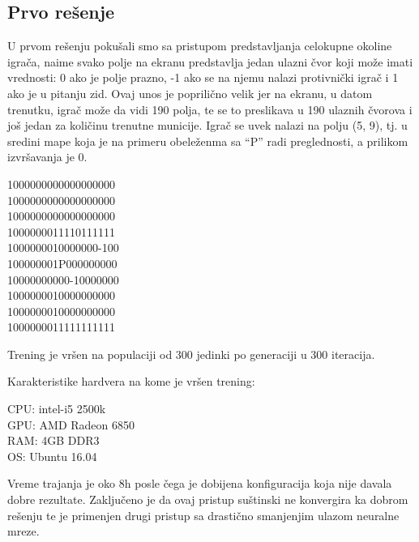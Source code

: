 \documentclass[a4paper]{article}
\begin{document}
\subsection {Prvo rešenje}
\par U prvom rešenju pokušali smo sa pristupom predstavljanja celokupne okoline igrača, naime svako polje na ekranu predstavlja jedan ulazni čvor koji može imati vrednosti: 0 ako je polje prazno, -1 ako se na njemu nalazi protivnički igrač i 1 ako je u pitanju zid. Ovaj unos je poprilično velik jer na ekranu, u datom trenutku, igrač može da vidi 190 polja, te se to preslikava u 190 ulaznih čvorova i još jedan za količinu trenutne municije.  Igrač se uvek nalazi na polju (5, 9), tj. u sredini mape koja je na primeru obeleženma sa  “P” radi preglednosti, a prilikom izvršavanja je 0.  
\newline
\begin{tcolorbox}
\begin {center}
1000000000000000000 \\
1000000000000000000\\
1000000000000000000\\
1000000011110111111\\
1000000010000000-100\\
100000001P000000000\\
10000000000-10000000\\
1000000010000000000\\
1000000010000000000\\
1000000011111111111\\
\end{center}
\end{tcolorbox}

Trening je vršen na populaciji od 300 jedinki po generaciji u 300 iteracija.
\newline
\begin{tcolorbox}
\begin {center}
Karakteristike hardvera na kome je vršen trening: \\
\end {center}
CPU: intel-i5 2500k \\
GPU: AMD Radeon 6850 \\
RAM: 4GB DDR3 \\
OS: Ubuntu 16.04 \\
\end{tcolorbox}
\noindent Vreme trajanja je oko 8h posle čega je dobijena konfiguracija koja nije davala dobre rezultate. Zaključeno je da ovaj pristup suštinski ne konvergira ka dobrom rešenju te je primenjen drugi pristup sa drastično smanjenjim ulazom neuralne mreze.
\end{document}

